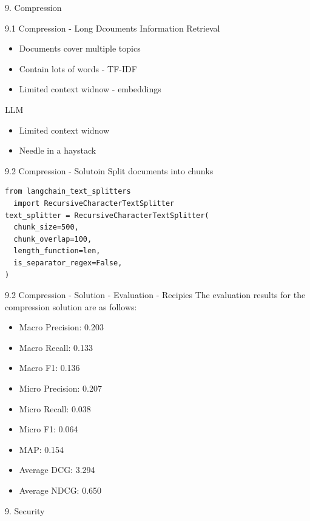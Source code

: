 \documentclass{beamer}
\begin{document}
\begin{frame}{9. Compression}
\end{frame}

\begin{frame}{9.1 Compression - Long Dcouments}
  Information Retrieval
  \begin{itemize}
    \item Documents cover multiple topics
    \item Contain lots of words - TF-IDF
    \item Limited context widnow - embeddings
  \end{itemize}
  LLM
  \begin{itemize}
    \item Limited context widnow
    \item Needle in a haystack
  \end{itemize}
\end{frame}

\begin{frame}[fragile]{9.2 Compression - Solutoin}
  Split documents into chunks
  \begin{verbatim}
from langchain_text_splitters
  import RecursiveCharacterTextSplitter
text_splitter = RecursiveCharacterTextSplitter(
  chunk_size=500,
  chunk_overlap=100,
  length_function=len,
  is_separator_regex=False,
)
\end{verbatim}
\end{frame}

\begin{frame}{9.2 Compression - Solution - Evaluation - Recipies}
  The evaluation results for the compression solution are as follows:
  \begin{itemize}
    \item Macro Precision: 0.203
    \item Macro Recall: 0.133
    \item Macro F1: 0.136
    \item Micro Precision: 0.207
    \item Micro Recall: 0.038
    \item Micro F1: 0.064
    \item MAP: 0.154
    \item Average DCG: 3.294
    \item Average NDCG: 0.650
  \end{itemize}
\end{frame}


\begin{frame}{9. Security}
\end{frame}
\end{document}
